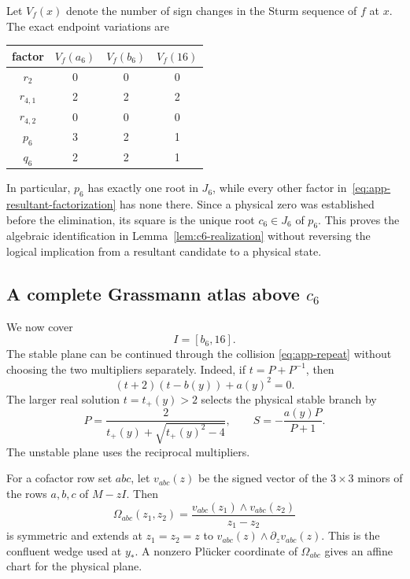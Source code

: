 Let \(V_f(x)\) denote the number of sign changes in the Sturm sequence of
\(f\) at \(x\).  The exact endpoint variations are
\begin{center}
\begin{tabular}{c@{\qquad}ccc}
\toprule
factor & \(V_f(a_6)\) & \(V_f(b_6)\) & \(V_f(16)\)\\
\midrule
\(r_2\)     &0&0&0\\
\(r_{4,1}\)&2&2&2\\
\(r_{4,2}\)&0&0&0\\
\(p_6\)     &3&2&1\\
\(q_6\)     &2&2&1\\
\bottomrule
\end{tabular}
\end{center}
In particular, \(p_6\) has exactly one root in \(J_6\), while every other
factor in~\eqref{eq:app-resultant-factorization} has none there.  Since a
physical zero was established before the elimination, its square is the
unique root \(c_6\in J_6\) of \(p_6\).  This proves the algebraic
identification in Lemma~\ref{lem:c6-realization} without reversing the
logical implication from a resultant candidate to a physical state.

\subsection{A complete Grassmann atlas above \(c_6\)}
\label{appsubsec:g6-atlas}

We now cover
\[
 I=[b_6,16].
\]
The stable plane can be continued through the collision
\eqref{eq:app-repeat} without choosing the two multipliers separately.
Indeed, if \(t=P+P^{-1}\), then
\begin{equation}
 (t+2)(t-b(y))+a(y)^2=0.                              \label{eq:app-t-equation}
\end{equation}
The larger real solution \(t=t_+(y)>2\) selects the physical stable branch
by
\begin{equation}
 P=\frac{2}{t_+(y)+\sqrt{t_+(y)^2-4}},
 \qquad S=-\frac{a(y)P}{P+1}.                         \label{eq:app-SP-branch}
\end{equation}
The unstable plane uses the reciprocal multipliers.

For a cofactor row set \(abc\), let \(v_{abc}(z)\) be the signed vector of
the \(3\times3\) minors of the rows \(a,b,c\) of \(M-zI\).  Then
\[
 \Omega_{abc}(z_1,z_2)
 =\frac{v_{abc}(z_1)\wedge v_{abc}(z_2)}{z_1-z_2}
\]
is symmetric and extends at \(z_1=z_2=z\) to
\(v_{abc}(z)\wedge\partial_zv_{abc}(z)\).  This is the confluent wedge used
at \(y_*\).  A nonzero Pl\"ucker coordinate of \(\Omega_{abc}\) gives an
affine chart for the physical plane.

